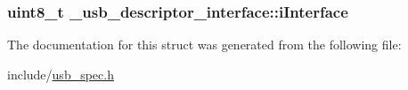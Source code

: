 \hypertarget{struct__usb__descriptor__interface_acbe1bce5e0dab87025d4e59ec2ed8780}{
\subsubsection[{i\-Interface}]{\setlength{\rightskip}{0pt plus 5cm}uint8\-\_\-t \-\_\-usb\-\_\-descriptor\-\_\-interface\-::i\-Interface}}\label{struct__usb__descriptor__interface_acbe1bce5e0dab87025d4e59ec2ed8780}


The documentation for this struct was generated from the following file\-:\begin{DoxyCompactItemize}
\item 
include/\hyperlink{usb__spec_8h}{usb\-\_\-spec.\-h}\end{DoxyCompactItemize}
